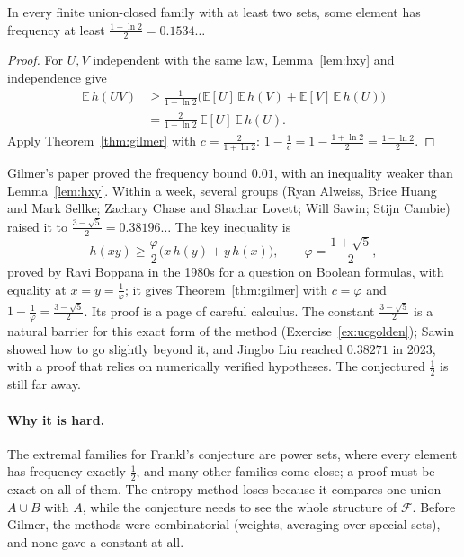 \begin{corollary}\label{cor:ucconst}
In every finite union-closed family with at least two sets, some element has frequency at least $\frac{1-\ln2}2=0.1534\ldots$
\end{corollary}
\begin{proof}
For $U,V$ independent with the same law, Lemma~\ref{lem:hxy} and independence give
\[
\begin{aligned}\mathbb E\,h(UV)&\ge\frac1{1+\ln2}\bigl(\mathbb E[U]\,\mathbb E\,h(V)+\mathbb E[V]\,\mathbb E\,h(U)\bigr)\\&=\frac2{1+\ln2}\,\mathbb E[U]\,\mathbb E\,h(U).\end{aligned}
\]
Apply
Theorem~\ref{thm:gilmer} with $c=\frac2{1+\ln2}$: $1-\frac1c=1-\frac{1+\ln2}2=\frac{1-\ln2}2$.
\end{proof}

\begin{remark}\label{rem:ucrace}
Gilmer's paper proved the frequency bound $0.01$, with an inequality weaker than Lemma~\ref{lem:hxy}. Within a week, several groups (Ryan Alweiss,
Brice Huang and Mark Sellke; Zachary Chase and Shachar Lovett; Will Sawin; Stijn Cambie) raised it to $\frac{3-\sqrt5}2=0.38196\ldots$ The key
inequality is
\[
h(xy)\ge\frac\varphi2\bigl(x\,h(y)+y\,h(x)\bigr),\qquad\varphi=\frac{1+\sqrt5}2,
\]
proved by Ravi Boppana in the 1980s for a question on Boolean formulas, with equality at $x=y=\frac1\varphi$; it gives Theorem~\ref{thm:gilmer} with
$c=\varphi$ and $1-\frac1\varphi=\frac{3-\sqrt5}2$. Its proof is a page of careful calculus. The constant $\frac{3-\sqrt5}2$ is a natural barrier for
this exact form of the method (Exercise~\ref{ex:ucgolden}); Sawin showed how to go slightly beyond it, and Jingbo Liu reached $0.38271$ in 2023, with a
proof that relies on numerically verified hypotheses. The conjectured $\frac12$ is still far away.
\end{remark}

\paragraph{Why it is hard.} The extremal families for Frankl's conjecture are power sets, where every element has frequency exactly $\frac12$, and many
other families come close; a proof must be exact on all of them. The entropy method loses because it compares one union $A\cup B$ with $A$, while the
conjecture needs to see the whole structure of $\mathcal F$. Before Gilmer, the methods were combinatorial (weights, averaging over special sets), and
none gave a constant at all.

